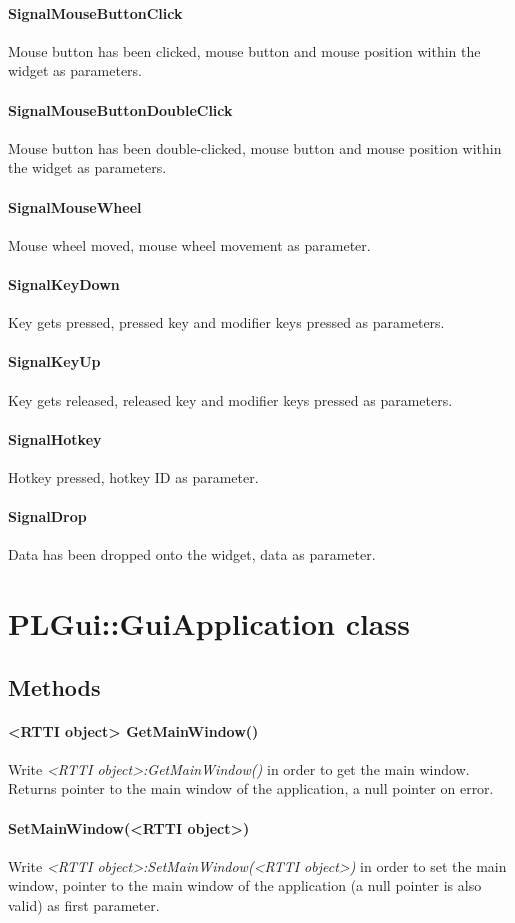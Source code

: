 \paragraph{SignalMouseButtonClick}
Mouse button has been clicked, mouse button and mouse position within the widget as parameters.

\paragraph{SignalMouseButtonDoubleClick}
Mouse button has been double-clicked, mouse button and mouse position within the widget as parameters.

\paragraph{SignalMouseWheel}
Mouse wheel moved, mouse wheel movement as parameter.

\paragraph{SignalKeyDown}
Key gets pressed, pressed key and modifier keys pressed as parameters.

\paragraph{SignalKeyUp}
Key gets released, released key and modifier keys pressed as parameters.

\paragraph{SignalHotkey}
Hotkey pressed, hotkey ID as parameter.

\paragraph{SignalDrop}
Data has been dropped onto the widget, data as parameter.




\section{PLGui::GuiApplication class}


\subsection{Methods}

\paragraph{<RTTI object> GetMainWindow()}
Write \emph{<RTTI object>:GetMainWindow()} in order to get the main window. Returns pointer to the main window of the application, a null pointer on error.

\paragraph{SetMainWindow(<RTTI object>)}
Write \emph{<RTTI object>:SetMainWindow(<RTTI object>)} in order to set the main window, pointer to the main window of the application (a null pointer is also valid) as first parameter.

